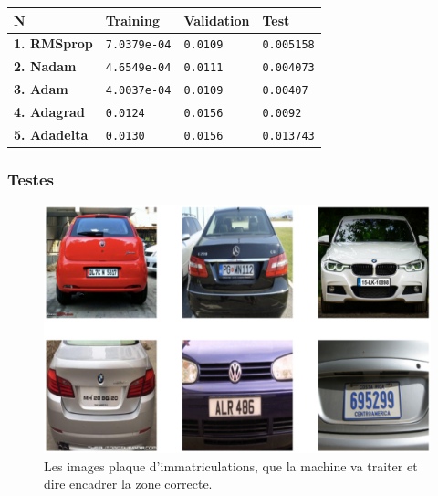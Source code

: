 	\begin{table}[H]
		\centering
		\begin{tabular}{|l|p{3cm}|p{3cm}|p{3cm}|}
			\hline
			\textbf{N\textdegree} & \textbf{Training} & \textbf{Validation} & \textbf{Test} \\
			\hline
			\textbf{1. RMSprop} &
			\texttt{7.0379e-04} &
			\texttt{0.0109} &
			\texttt{0.005158} \\
			\hline
			\textbf{2. Nadam} &
			\texttt{4.6549e-04} &
			\texttt{0.0111} &
			\texttt{0.004073} \\
			\hline
			\textbf{3. Adam} &
			\texttt{4.0037e-04} &
			\texttt{0.0109} &
			\texttt{0.00407} \\
			\hline
			\textbf{4. Adagrad} &
			\texttt{0.0124} &
			\texttt{0.0156} &
			\texttt{0.0092} \\
			\hline
			\textbf{5. Adadelta} &
			\texttt{0.0130} &
			\texttt{0.0156} &
			\texttt{0.013743} \\
			\hline
		\end{tabular}
	\end{table}

	\subsubsection*{Testes}
	
	
	\begin{figure}[H]%
		\centering
		\includegraphics[width=\textwidth]{images/dataset_image}
		\caption{Les images plaque d'immatriculations, que la machine va traiter et dire encadrer la zone correcte.}
		\label{fig:dataset_image}
	\end{figure}

